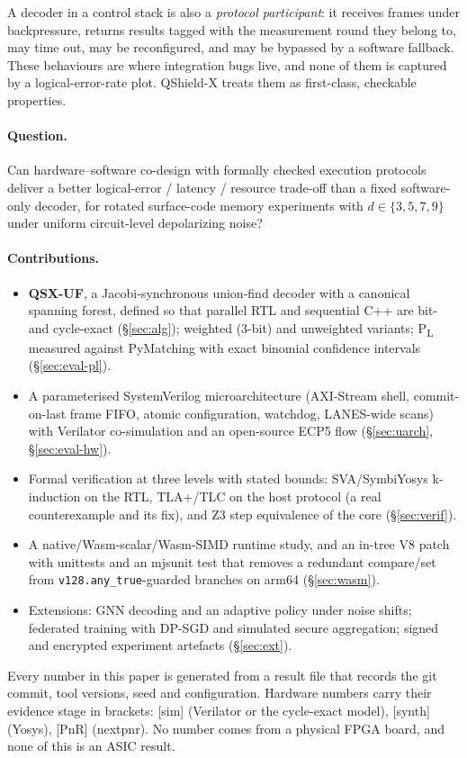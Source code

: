 \documentclass[10pt]{article}
\newcommand{\stage}[1]{\textsf{\small[#1]}}
\begin{document}
A decoder in a control stack is also a \emph{protocol participant}: it receives frames under backpressure,
returns results tagged with the measurement round they belong to, may time out, may be reconfigured, and
may be bypassed by a software fallback. These behaviours are where integration bugs live, and none of them
is captured by a logical-error-rate plot. QShield-X treats them as first-class, checkable properties.

\paragraph{Question.} Can hardware--software co-design with formally checked execution protocols deliver a
better logical-error / latency / resource trade-off than a fixed software-only decoder, for rotated
surface-code memory experiments with $d\in\{3,5,7,9\}$ under uniform circuit-level depolarizing noise?

\paragraph{Contributions.}
\begin{itemize}
\item \textbf{QSX-UF}, a Jacobi-synchronous union-find decoder with a canonical spanning forest, defined so
  that parallel RTL and sequential C++ are bit- and cycle-exact (\S\ref{sec:alg}); weighted (3-bit) and
  unweighted variants; P\textsubscript{L} measured against PyMatching with exact binomial confidence
  intervals (\S\ref{sec:eval-pl}).
\item A parameterised SystemVerilog microarchitecture (AXI-Stream shell, commit-on-last frame FIFO, atomic
  configuration, watchdog, LANES-wide scans) with Verilator co-simulation and an open-source ECP5 flow
  (\S\ref{sec:uarch}, \S\ref{sec:eval-hw}).
\item Formal verification at three levels with stated bounds: SVA/SymbiYosys k-induction on the RTL, TLA+/TLC on
  the host protocol (a real counterexample and its fix), and Z3 step equivalence of the core
  (\S\ref{sec:verif}).
\item A native/Wasm-scalar/Wasm-SIMD runtime study, and an in-tree V8 patch with unittests and an mjsunit
  test that removes a redundant compare/set from \texttt{v128.any\_true}-guarded branches on arm64
  (\S\ref{sec:wasm}).
\item Extensions: GNN decoding and an adaptive policy under noise shifts; federated training with DP-SGD and
  simulated secure aggregation; signed and encrypted experiment artefacts (\S\ref{sec:ext}).
\end{itemize}
Every number in this paper is generated from a result file that records the git commit, tool versions, seed
and configuration. Hardware numbers carry their evidence stage in brackets: \stage{sim} (Verilator or the
cycle-exact model), \stage{synth} (Yosys), \stage{PnR} (nextpnr). No number comes from a physical FPGA board,
and none of this is an ASIC result.
\end{document}
